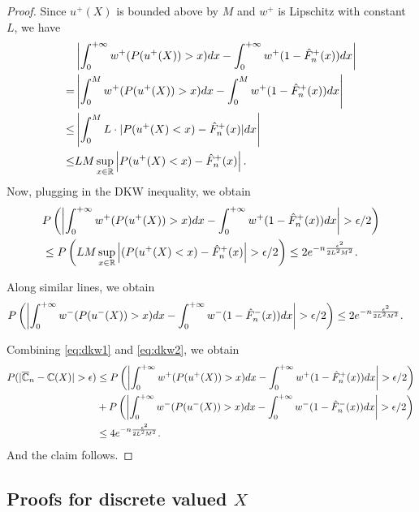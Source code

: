 \begin{proof}
Since $u^+(X)$ is bounded above by $M$ and $w^+$ is Lipschitz with constant $L$, we have
\begin{align*}
&\left|\int_0^{+\infty} w^+(P(u^+(X))>x) dx- \int_0^{+\infty} w^+(1- {\hat F_n}^+(x)) dx\right|
\\
= & \left|\int_0^M w^+(P(u^+(X))>x) dx- \int_0^M w^+(1- {\hat F_n}^+(x)) dx\right|
\\
\leq&
\left|\int_0^M L\cdot |P(u^+(X)<x)-{\hat F_n}^+(x)| dx\right|\\
\leq&
LM\sup_{x\in \mathbb{R}}\left|P(u^+(X)<x)-{\hat F_n}^+(x)\right|.
\end{align*}
Now, plugging in the DKW inequality, we obtain
\begin{align}
&
P\left(\left|\intinfinity w^+(P(u^+(X))>x) dx- \intinfinity w^+(1- {\hat F_n}^+(x)) dx\right|>\epsilon/2\right)
\nonumber\\
&
\leq
 P\left(LM\sup_{x\in \mathbb{R}} \left|(P(u^+(X)<x)-{\hat F_n}^+(x)\right|>\epsilon/2\right) \leq 2 e^{-n \frac{\epsilon^2}{2 L^2 M^2}}.\label{eq:dkw1}
\end{align}

Along similar lines, we obtain
\begin{align}
&
P\left(\left|\intinfinity w^-(P(u^-(X))>x) dx- \intinfinity w^-(1- {\hat F_n}^-(x)) dx\right|>\epsilon/2\right)
 \leq 2 e^{-n \frac{\epsilon^2}{2 L^2 M^2}}.\label{eq:dkw2}
\end{align}

Combining \eqref{eq:dkw1} and \eqref{eq:dkw2}, we obtain
\begin{align*}
P(|\overline \C_n - \C(X)|>\epsilon) 
&\le P\left(\left|\intinfinity w^+(P(u^+(X))>x) dx- \intinfinity w^+(1- {\hat F_n}^+(x)) dx\right|>\epsilon/2\right) \\
&+ 
P\left(\left|\intinfinity w^-(P(u^-(X))>x) dx- \intinfinity w^-(1- {\hat F_n}^-(x)) dx\right|>\epsilon/2\right)\\
&\le 4 e^{-n \frac{\epsilon^2}{2 L^2 M^2}}.
\end{align*} 
And the claim follows. 
\end{proof}

\subsection{Proofs for discrete valued $X$}
\label{sec:proofs-discrete}


